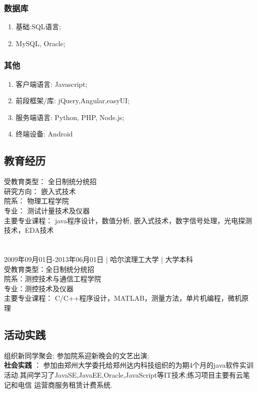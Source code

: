 \documentclass[11pt]{ctexart}
\begin{document}
\subsubsection{数据库}
\label{sec-1-2-3}
\begin{enumerate}
\item 基础:SQL语言;
\item MySQL, Oracle;
\end{enumerate}
\subsubsection{其他}
\label{sec-1-2-4}
\begin{enumerate}
\item 客户端语言: Javascript;
\item 前段框架/库: jQuery,Angular,easyUI;
\item 服务端语言: Python, PHP, Node.js;
\item 终端设备: Android
\end{enumerate}
\subsection{教育经历}
\label{sec-1-3}
受教育类型： 全日制统分统招\\
研究方向： 嵌入式技术\\
院系： 物理工程学院\\
专业： 测试计量技术及仪器\\
主要专业课程： java程序设计，数值分析, 嵌入式技术，数字信号处理，光电探测技术，EDA技术\\
\\
\\
2009年09月01日-2013年06月01日 | 哈尔滨理工大学 | 大学本科\\
受教育类型：全日制统分统招\\
院系：测控技术与通信工程学院\\

专业：测控技术及仪器\\
主要专业课程： C/C++程序设计，MATLAB，测量方法，单片机编程，微机原理\\
\subsection{活动实践}
\label{sec-1-4}
组织新同学聚会;
参加院系迎新晚会的文艺出演;\\
\textbf{社会实践} ： 参加由郑州大学委托给郑州达内科技组织的为期4个月的java软件实训活动.其间学习了JavaSE,JavaEE,Oracle,JavaScript等IT技术;练习项目主要有云笔记和电信
运营商服务租赁计费系统.
\end{document}
